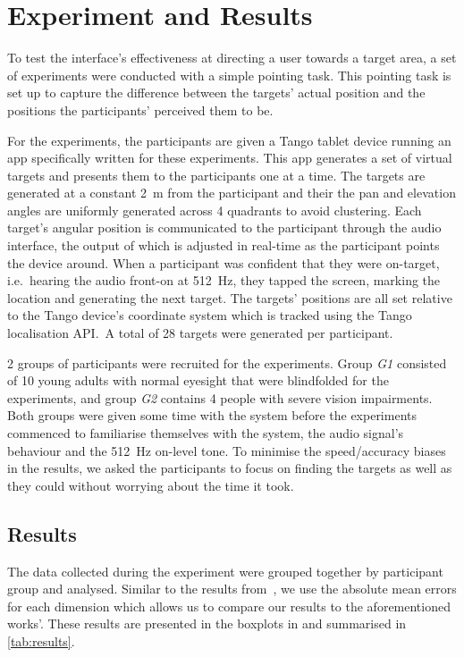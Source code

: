 \documentclass{llncs}
\begin{document}
\section{Experiment and Results}\label{sec:experiment-and-results}

To test the interface's effectiveness at directing a user towards a target area, a set of experiments were conducted with a simple pointing task. 
This pointing task is set up to capture the difference between the targets' actual position and the positions the participants' perceived them to be.

For the experiments, the participants are given a Tango tablet device running an app specifically written for these experiments. 
This app generates a set of virtual targets and presents them to the participants one at a time. 
The targets are generated at a constant \SI{2}{\meter} from the participant and their the pan and elevation angles are uniformly generated across 4 quadrants to avoid clustering.
Each target's angular position is communicated to the participant through the audio interface, the output of which is adjusted in real-time as the participant points the device around. 
When a participant was confident that they were on-target, i.e.\ hearing the audio front-on at \SI{512}{\hertz}, they tapped the screen, marking the location and generating the next target.
The targets' positions are all set relative to the Tango device's coordinate system which is tracked using the Tango localisation API.\
A total of 28 targets were generated per participant. 

2 groups of participants were recruited for the experiments. 
Group \textit{G1} consisted of 10 young adults with normal eyesight that were blindfolded for the experiments, and group \textit{G2} contains 4 people with severe vision impairments. 
Both groups were given some time with the system before the experiments commenced to familiarise themselves with the system, the audio signal's behaviour and the \SI{512}{\hertz} on-level tone. 
To minimise the speed/accuracy biases in the results, we asked the participants to focus on finding the targets as well as they could without worrying about the time it took.  

\subsection{Results}

The data collected during the experiment were grouped together by participant group and analysed.
Similar to the results from~\cite{macdonald2006spatial,schonstein2008comparison}, we use the absolute mean errors for each dimension which allows us to compare our results to the aforementioned works'. 
These results are presented in the boxplots in \crefrange{fig:sighted-err}{fig:blind-err} and summarised in \cref{tab:results}.
\end{document}
